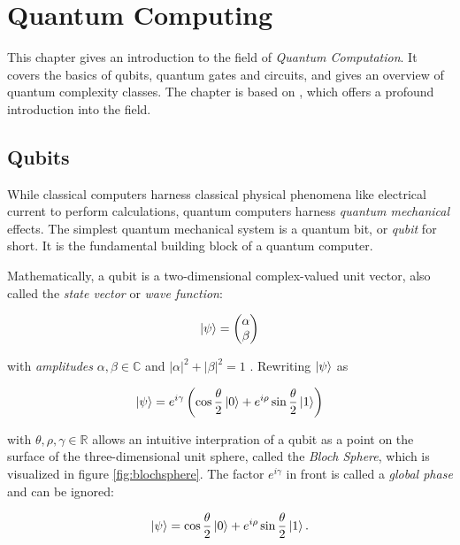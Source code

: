 \chapter{Quantum Computing}

This chapter gives an introduction to the field of \textit{Quantum Computation}. It covers the basics of qubits, quantum gates and circuits, and gives an overview of quantum complexity classes. The chapter is based on \cite{nielsen2002quantum}, which offers a profound introduction into the field.

\section{Qubits}

While classical computers harness classical physical phenomena like electrical current to perform calculations, quantum computers harness 
\textit{quantum mechanical} effects. The simplest quantum mechanical system is a quantum bit, or
\textit{qubit} for short. It is the fundamental building block of a quantum computer.

Mathematically, a qubit is a two-dimensional complex-valued unit vector,
also called the \textit{state vector} or \textit{wave function}:

\begin{equation}
  \label{eq:qubit1}
  \Ket{\psi} = \begin{pmatrix} \alpha \\ \beta \end{pmatrix}
\end{equation}

with \textit{amplitudes} $\alpha, \beta \in \mathbb{C}$ and $|\alpha|^2 + |\beta| ^2 = 1$ . 
Rewriting $\Ket{\psi}$ as

\begin{equation}
  \Ket{\psi} = e^{i \gamma} \left( \cos{\frac{\theta}{2}} \Ket{0} + e^{i \rho} \sin{\frac{\theta}{2}} \Ket{1} \right)
\end{equation}

with $\theta, \rho, \gamma \in \mathbb{R}$
allows an intuitive interpration of a qubit as a point on the surface of the three-dimensional unit sphere,
called the \textit{Bloch Sphere}, which is visualized in figure
\ref{fig:blochsphere}. The factor $e^{i \gamma}$ in front is called a
\textit{global phase} and can be ignored:

\begin{equation}
  \Ket{\psi} = \cos{\frac{\theta}{2}} \Ket{0} + e^{i \rho} \sin{\frac{\theta}{2}} \Ket{1}.
\end{equation}

